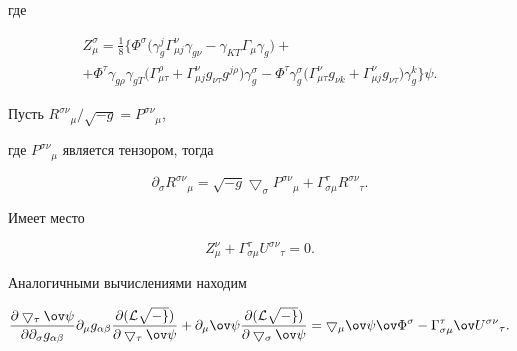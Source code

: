 где


\begin{multline*}


Z^\sigma_\mu=\frac{1}{8}\big\{\Phi^\sigma\big(


\gamma_g^j\Gamma^\nu_{\mu j}\gamma_{g\nu}-\gamma_{KT}


\Gamma_\mu\gamma_g\big)+ \\


%


+\Phi^\tau\gamma_{g\rho}\gamma_{gT}\big(\Gamma^\rho_{\mu\tau}


+\Gamma^\nu_{\mu j}g_{\nu\tau}g^{j\rho}\big)\gamma_g^\sigma-


\Phi^\tau\gamma_g^\sigma\big(\Gamma^\nu_{\mu\tau}g_{\nu k}+


\Gamma^\nu_{\mu j}g_{\nu\tau}\big)\gamma_g^k\big\}\psi.


\end{multline*}


Пусть $R^{\sigma\nu}{}_\mu/\sqrt{-g}=P^{\sigma\nu}{}_\mu$,


где $P^{\sigma\nu}{}_\mu$ является тензором, тогда


$$


\partial_\sigma R^{\sigma\nu}{}_\mu=\sqrt{-g}\bigtriangledown_


\sigma P^{\sigma\nu}{}_\mu+\Gamma^\tau_{\sigma\mu}


R^{\sigma\nu}{}_\tau.


$$


Имеет место


$$


Z^\nu_\mu+\Gamma^\tau_{\sigma\mu}U^{\sigma\nu}{}_\tau=0.


$$


Аналогичными вычислениями находим


$$


\frac{\partial\bigtriangledown_\tau\ov\psi}{\partial\partial_\sigma


g_{\alpha\beta}}\partial_\mu g_{\alpha\beta}


\frac{\partial( \cal L\sqrt{-g})}{\partial\bigtriangledown_\tau


\ov\psi}+\partial_\mu\ov\psi


\frac{\partial(\cal L\sqrt{-g})}{\partial\bigtriangledown_\sigma


\ov\psi}=\bigtriangledown_\mu\ov\psi\ov\Phi^\sigma-


\Gamma^\tau_{\sigma\mu}\ov U^{\sigma\nu}{}_\tau.


$$


